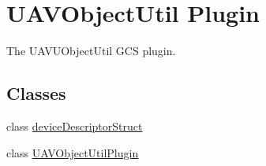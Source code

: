 \hypertarget{group___u_a_v_object_util_plugin}{\section{U\-A\-V\-Object\-Util Plugin}
\label{group___u_a_v_object_util_plugin}
}


The U\-A\-V\-U\-Object\-Util G\-C\-S plugin.  


\subsection*{Classes}
\begin{DoxyCompactItemize}
\item 
class \hyperlink{classdevice_descriptor_struct}{device\-Descriptor\-Struct}
\item 
class \hyperlink{class_u_a_v_object_util_plugin}{U\-A\-V\-Object\-Util\-Plugin}
\end{DoxyCompactItemize}
